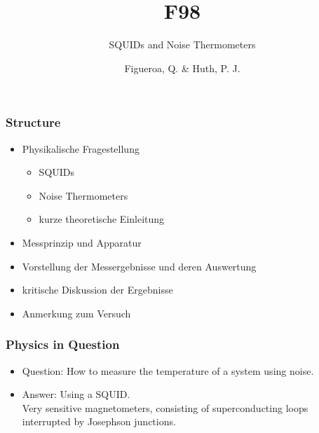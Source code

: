 \documentclass[16pt]{beamer}
\begin{document}
	\author{Figueroa, Q. \& Huth, P. J.}
	\title{F98}
	\subtitle{SQUIDs and Noise Thermometers}
	\begin{frame}[plain]
		\maketitle
	\end{frame}
	
	\begin{frame}
		\frametitle{Structure}

		\begin{itemize}
			\item Physikalische Fragestellung 
			\begin{itemize}
				\item SQUIDs
				\item Noise Thermometers
				\item kurze theoretische Einleitung
			\end{itemize}
			\item Messprinzip und Apparatur 
			\item Vorstellung der Messergebnisse und deren Auswertung
			\item kritische Diskussion der Ergebnisse
			\item Anmerkung zum Versuch
		\end{itemize}
	\end{frame}

	\begin{frame}
		\frametitle{Physics in Question}
		\begin{itemize}

			\item Question: How to measure the temperature of a system using noise.
			\item Answer: Using a SQUID.\\
				Very sensitive magnetometers, consisting of superconducting loops interrupted by Josephson junctions.
		\end{itemize}
	\end{frame}
\end{document}
